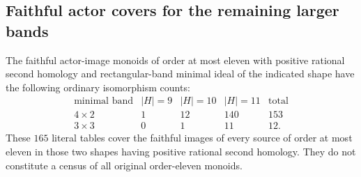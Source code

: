 \subsection{Faithful actor covers for the remaining larger bands}

\begin{proposition}
\label{CP2:A-remaining-faithful-hulls-through11}
The faithful actor-image monoids of order at most eleven with
positive rational second homology and rectangular-band minimal
ideal of the indicated shape have the following ordinary
isomorphism counts:
\[
\begin{array}{c|rrr|r}
\text{minimal band}&|H|=9&|H|=10&|H|=11&\text{total}\\\hline
4\times2&1&12&140&153\\
3\times3&0&1&11&12.
\end{array}
\]
These $165$ literal tables cover the faithful images of every
source of order at most eleven in those two shapes having
positive rational second homology.  They do not
constitute a census of all original order-eleven monoids.
\end{proposition}
